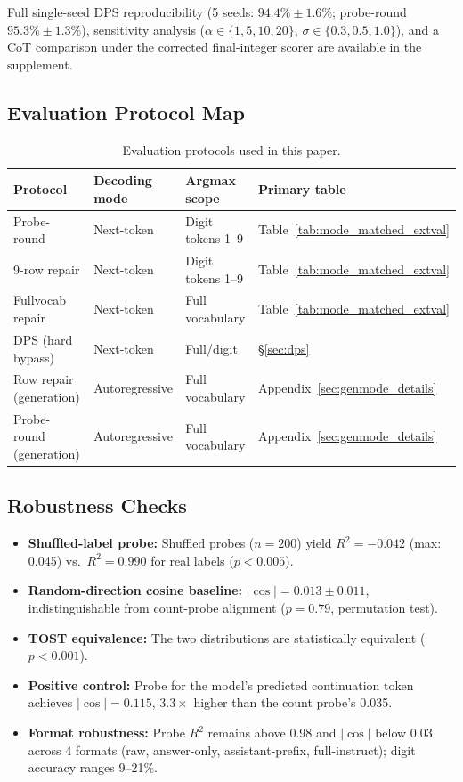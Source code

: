 \documentclass{article}
\begin{document}
Full single-seed DPS reproducibility (5 seeds: $94.4\% \pm 1.6\%$; probe-round
$95.3\% \pm 1.3\%$), sensitivity analysis ($\alpha \in \{1,5,10,20\}$,
$\sigma \in \{0.3, 0.5, 1.0\}$), and a CoT comparison under the corrected
final-integer scorer are available in the supplement.

\subsection{Evaluation Protocol Map}
\label{sec:protocol_map}

\begin{table}[h]
\caption{Evaluation protocols used in this paper.}
\label{tab:protocol_map}
\begin{tabular}{llll}
\toprule
Protocol & Decoding mode & Argmax scope & Primary table \\
\midrule
Probe-round & Next-token & Digit tokens 1--9 & Table~\ref{tab:mode_matched_extval} \\
9-row repair & Next-token & Digit tokens 1--9 & Table~\ref{tab:mode_matched_extval} \\
Fullvocab repair & Next-token & Full vocabulary & Table~\ref{tab:mode_matched_extval} \\
DPS (hard bypass) & Next-token & Full/digit & \S\ref{sec:dps} \\
Row repair (generation) & Autoregressive & Full vocabulary & Appendix~\ref{sec:genmode_details} \\
Probe-round (generation) & Autoregressive & Full vocabulary & Appendix~\ref{sec:genmode_details} \\
\bottomrule
\end{tabular}
\end{table}

\subsection{Robustness Checks}
\label{sec:robustness_checks}

\begin{itemize}
\item \textbf{Shuffled-label probe:} Shuffled probes ($n{=}200$) yield $R^2 =
  -0.042$ (max: 0.045) vs.\ $R^2 = 0.990$ for real labels ($p < 0.005$).
\item \textbf{Random-direction cosine baseline:} $|\cos| = 0.013 \pm 0.011$,
  indistinguishable from count-probe alignment ($p = 0.79$, permutation test).
\item \textbf{TOST equivalence:} The two distributions are statistically
  equivalent ($p < 0.001$).
\item \textbf{Positive control:} Probe for the model's predicted continuation
  token achieves $|\cos| = 0.115$, $3.3\times$ higher than the count probe's
  0.035.
\item \textbf{Format robustness:} Probe $R^2$ remains above 0.98 and $|\cos|$
  below 0.03 across 4 formats (raw, answer-only, assistant-prefix,
  full-instruct); digit accuracy ranges 9--21\%.
\end{itemize}
\end{document}
